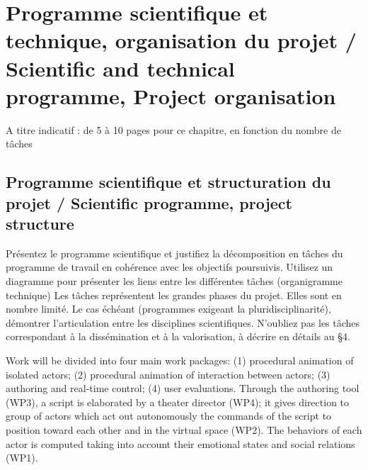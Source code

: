 
\section{Programme scientifique et technique, organisation du projet / Scientific and technical programme, Project organisation}
\begin{xcomment}  
A titre indicatif : de 5 à 10  pages pour ce chapitre, en fonction du nombre de tâches
\end{xcomment}

\subsection{Programme scientifique et structuration du projet  / Scientific programme, project structure}
\begin{xcomment}  
 Pr\'esentez le programme scientifique et justifiez la d\'ecomposition en tâches du programme de travail en coh\'erence avec les objectifs poursuivis. 
Utilisez un diagramme pour pr\'esenter les liens entre les diff\'erentes tâches (organigramme technique)
Les tâches repr\'esentent les grandes phases du projet. Elles sont en nombre limit\'e.
Le cas \'ech\'eant (programmes exigeant la pluridisciplinarit\'e), d\'emontrer l'articulation entre les disciplines scientifiques.
N'oubliez pas les tâches correspondant à la diss\'emination et à la valorisation, à d\'ecrire en d\'etails au §4.

\end{xcomment}



Work will be divided into four main work packages: (1) procedural animation of isolated actors; (2) procedural animation of interaction between actors; (3) authoring and real-time control; (4) user evaluations. Through the authoring tool (WP3), a script is elaborated by a theater director (WP4); it gives direction to group of actors which act out autonomously the commands of the script to position toward each other and in the virtual space (WP2). The behaviors of each actor is computed taking into account their emotional states and social relations (WP1).

\endinput